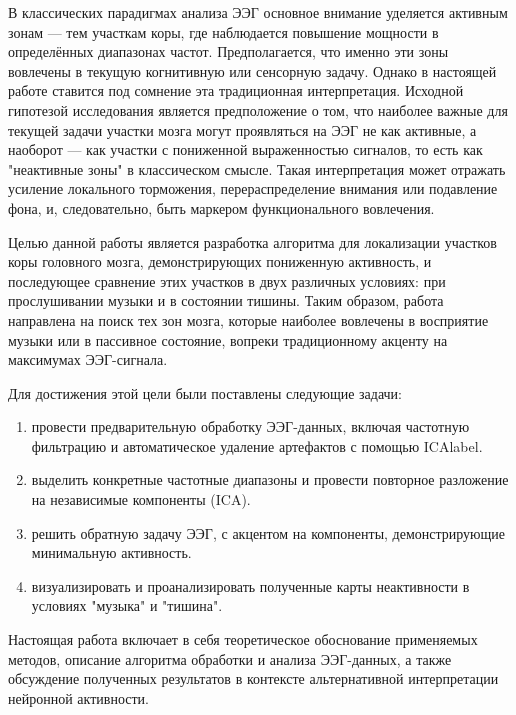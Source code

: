 В классических парадигмах анализа ЭЭГ основное внимание уделяется активным зонам — тем участкам коры, где наблюдается повышение мощности в определённых диапазонах частот. Предполагается, что именно эти зоны вовлечены в текущую когнитивную или сенсорную задачу. Однако в настоящей работе ставится под сомнение эта традиционная интерпретация. Исходной гипотезой исследования является предположение о том, что наиболее важные для текущей задачи участки мозга могут проявляться на ЭЭГ не как активные, а наоборот — как участки с пониженной выраженностью сигналов, то есть как "неактивные зоны" в классическом смысле. Такая интерпретация может отражать усиление локального торможения, перераспределение внимания или подавление фона, и, следовательно, быть маркером функционального вовлечения.

Целью данной работы является разработка алгоритма для локализации участков коры головного мозга, демонстрирующих пониженную активность, и последующее сравнение этих участков в двух различных условиях: при прослушивании музыки и в состоянии тишины. Таким образом, работа направлена на поиск тех зон мозга, которые наиболее вовлечены в восприятие музыки или в пассивное состояние, вопреки традиционному акценту на максимумах ЭЭГ-сигнала.

Для достижения этой цели были поставлены следующие задачи:

\begin{enumerate}
    \item провести предварительную обработку ЭЭГ-данных, включая частотную фильтрацию и автоматическое удаление артефактов с помощью ICAlabel.
    \item выделить конкретные частотные диапазоны и провести повторное разложение на независимые компоненты (ICA).
    \item решить обратную задачу ЭЭГ, с акцентом на компоненты, демонстрирующие минимальную активность.
    \item визуализировать и проанализировать полученные карты неактивности в условиях "музыка" и "тишина".
\end{enumerate}

Настоящая работа включает в себя теоретическое обоснование применяемых методов, описание алгоритма обработки и анализа ЭЭГ-данных, а также обсуждение полученных результатов в контексте альтернативной интерпретации нейронной активности.

\endinput


